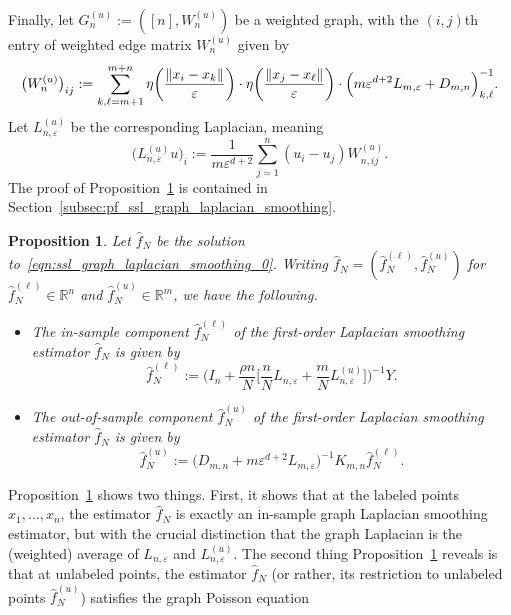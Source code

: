 \documentclass{article}
\newcommand{\Reals}{\mathbb{R}}
\newcommand{\1}{\mathbf{1}}
\newcommand{\wh}[1]{\widehat{#1}}
\theoremstyle{alden}
\theoremstyle{aldenthm}
\newtheorem{proposition}{Proposition}
\theoremstyle{definition}
\theoremstyle{remark}
\begin{document}
Finally, let $G_n^{(u)} := ([n], W_n^{(u)})$ be a weighted graph, with the $(i,j)$th entry of weighted edge matrix $W_n^{(u)}$ given by
\begin{equation}
\label{eqn:induced_insample_graph}
\bigl(W_{n}^{(u)}\bigr)_{ij} := \sum_{k,\ell = m + 1}^{m + n} \eta\biggl(\frac{\|x_i - x_k\|}{\varepsilon}\biggr) \cdot \eta\biggl(\frac{\|x_j - x_{\ell}\|}{\varepsilon}\biggr) \cdot \Bigl(m\varepsilon^{d + 2}L_{m,\varepsilon} + D_{m,n}\Bigr)_{k,\ell}^{-1}.
\end{equation}
Let $L_{n,\varepsilon}^{(u)}$ be the corresponding Laplacian, meaning
\begin{equation*}
\bigl(L_{n,\varepsilon}^{(u)}u\bigr)_{i} := \frac{1}{m\varepsilon^{d + 2}} \sum_{j = 1}^{n} (u_i - u_j) W_{n,ij}^{(u)}.
\end{equation*}
The proof of Proposition~\ref{prop:ssl_graph_laplacian_smoothing} is contained in Section~\ref{subsec:pf_ssl_graph_laplacian_smoothing}. 
\begin{proposition}
	\label{prop:ssl_graph_laplacian_smoothing}
	Let $\wh{f}_N$ be the solution to~\eqref{eqn:ssl_graph_laplacian_smoothing_0}. Writing $\wh{f}_N = (\wh{f}_N^{(\ell)},\wh{f}_N^{(u)})$ for $\wh{f}_N^{(\ell)} \in \Reals^n$ and $\wh{f}_N^{(u)} \in \Reals^m$, we have the following.
	\begin{itemize}
		\item The in-sample component $\wh{f}_N^{(\ell)}$ of the first-order Laplacian smoothing estimator $\wh{f}_N$ is given by
		\begin{equation*}
		\wh{f}_N^{(\ell)} := \biggl(I_n + \frac{\rho n}{N}\biggl[\frac{n}{N}L_{n,\varepsilon} + \frac{m}{N}L_{n,\varepsilon}^{(u)}\biggr]\biggr)^{-1} Y.
		\end{equation*}
		\item The out-of-sample component $\wh{f}_N^{(u)}$ of the first-order Laplacian smoothing estimator $\wh{f}_N$ is given by
		\begin{equation*}
		\wh{f}_N^{(u)} := \bigl(D_{m,n} + m\varepsilon^{d + 2}L_{m,\varepsilon}\bigr)^{-1} K_{m,n} \wh{f}_N^{(\ell)}.
		\end{equation*}
	\end{itemize}
\end{proposition}
Proposition~\ref{prop:ssl_graph_laplacian_smoothing} shows two things. First, it shows that at the labeled points $x_1,\ldots,x_n$, the estimator $\wh{f}_N$ is exactly an in-sample graph Laplacian smoothing estimator, but with the crucial distinction that the graph Laplacian is the (weighted) average of $L_{n,\varepsilon}$ and $L_{n,\varepsilon}^{(u)}$. The second thing Proposition~\ref{prop:ssl_graph_laplacian_smoothing} reveals is that at unlabeled points, the estimator $\wh{f}_N$ (or rather, its restriction to unlabeled points $\wh{f}_N^{(u)}$) satisfies the graph Poisson equation
\end{document}
